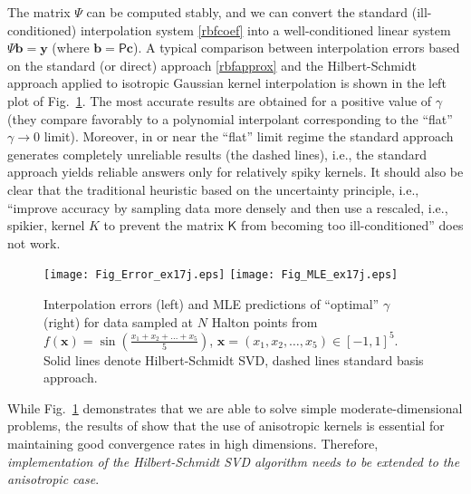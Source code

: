 \documentclass[11pt]{NSFamsart}
\newcommand{\mK}{\mathsf{K}}
\newcommand{\mP}{\mathsf{P}}
\newcommand{\mPsi}{\mathsf{\Psi}}
\newcommand{\bb}{{\boldsymbol{b}}}
\newcommand{\bc}{{\boldsymbol{c}}}
\newcommand{\bx}{{\boldsymbol{x}}}
\newcommand{\by}{{\boldsymbol{y}}}
\begin{document}
The matrix $\mPsi$ can be computed stably, and we can convert the standard (ill-conditioned) interpolation system \eqref{rbfcoef} into a well-conditioned linear system $\mPsi \bb = \by$ (where $\bb=\mP\bc$). A typical comparison between interpolation errors based on the standard (or direct) approach \eqref{rbfapprox} and the Hilbert-Schmidt approach applied to isotropic Gaussian kernel interpolation is shown in the left plot of Fig.~\ref{Fig_HSSVD}. The most accurate results are obtained for a positive value of $\gamma$ (they compare favorably to a polynomial interpolant corresponding to the ``flat'' $\gamma\to0$ limit). Moreover, in or near the ``flat'' limit regime the standard approach generates completely unreliable results (the dashed lines), i.e., the standard approach yields reliable answers only for relatively spiky kernels. It should also be clear that the traditional heuristic based on the uncertainty principle, i.e., ``improve accuracy by sampling data more densely and then use a rescaled, i.e., spikier, kernel $K$ to prevent the matrix $\mK$ from becoming too ill-conditioned'' does not work.

\begin{figure}[h]
    \centering
    \texttt{[image: Fig\_Error\_ex17j.eps]}
    \texttt{[image: Fig\_MLE\_ex17j.eps]}
\caption{Interpolation errors (left) and MLE predictions of ``optimal'' $\gamma$ (right) for data sampled at $N$ Halton points from $f(\bx) = \sin\left(\tfrac{x_1+x_2+\ldots+x_5}{5}\right)$, $\bx=(x_1,x_2,\ldots,x_5) \in [-1,1]^5$. Solid lines denote Hilbert-Schmidt SVD, dashed lines standard basis approach.}\label{Fig_HSSVD}
\end{figure}

While Fig.~\ref{Fig_HSSVD} demonstrates that we are able to solve simple moderate-dimensional problems, the results of \cite{FasHicWoz12b, FasHicWoz12a} show that the use of anisotropic kernels is essential for maintaining good convergence rates in high dimensions. Therefore, \emph{implementation of the Hilbert-Schmidt SVD algorithm needs to be extended to the anisotropic case}.
\end{document}

